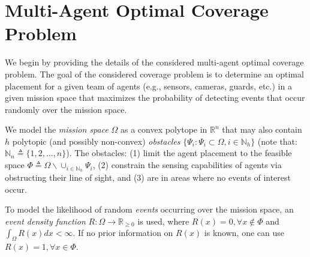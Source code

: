 \documentclass[letterpaper, 10 pt, conference]{ieeeconf}
\newcommand{\R}{\mathbb{R}}
\newcommand{\N}{\mathbb{N}}
\begin{document}



\section{Multi-Agent Optimal Coverage Problem}
\label{Sec:CoverageProblem}
We begin by providing the details of the considered multi-agent optimal coverage problem. The goal of the considered coverage problem is to determine an optimal placement for a given team of agents (e.g., sensors, cameras, guards, etc.) in a given mission space that maximizes the probability of detecting events that occur randomly over the mission space. 


We model the \emph{mission space} $\Omega$ as a convex polytope in $\R^n$ that may also contain $h$ polytopic (and possibly non-convex) \emph{obstacles} $\{\Psi_i:\Psi_i\subset\Omega, i\in\mathbb{N}_h\}$ (note that: $\mathbb{N}_n \triangleq \{1,2,\ldots,n\}$). The obstacles: (1) limit the agent placement to the feasible space $\Phi \triangleq \Omega \backslash \cup_{i\in\N_h} \Psi_i$, (2) constrain the sensing capabilities of agents via obstructing their line of sight, and (3) are in areas where no events of interest occur. 

To model the likelihood of random \emph{events} occurring over the mission space, an \emph{event density function} $R:\Omega \rightarrow \R_{\geq0}$ is used, where $R(x) = 0, \forall x \not\in \Phi$ and $\int_\Omega R(x)dx <\infty$. If no prior information on $R(x)$ is known, one can use $R(x)=1, \forall x\in \Phi$. 
\end{document}
